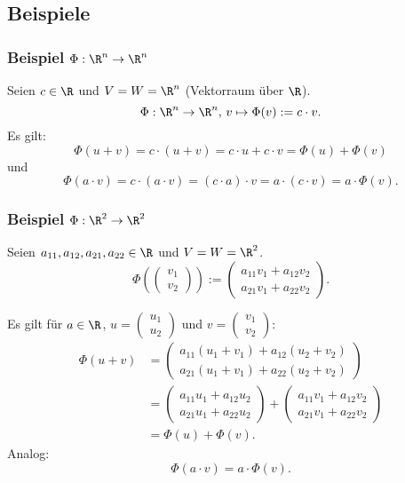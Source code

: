 \subsection{Beispiele}
%
\begin{frame}\frametitle{Beispiel $\Phi: \R^n\to \R^n$}


	Seien $c \in \R$ und $V=W=\R^n$ (Vektorraum über $\R$).
	$$
		\Phi: \R^n \to \R^n, \, v \mapsto \Phi(v) := c\cdot v.
	$$\pause
	Es gilt:
$$
		\Phi(u+v) 		= c\cdot(u+v) = c\cdot u + c\cdot v = \Phi(u) + \Phi(v)
$$\pause
und 
$$
		\Phi(a\cdot v)	= c\cdot (a\cdot v) = (c\cdot a)\cdot v = a\cdot (c\cdot v) = a\cdot \Phi(v).
$$
	
\end{frame}
%
%
\begin{frame}\frametitle{Beispiel $\Phi: \R^2\to \R^2$}

	Seien $a_{11}, a_{12}, a_{21}, a_{22} \in \R$ und $V=W=\R^2$.
	$$
		\Phi\left( 	
				\begin{pmatrix}
					v_1	\\
					v_2	
				\end{pmatrix}
			\right) 
		:=
		\begin{pmatrix}
			a_{11}v_1 + a_{12}v_2	\\
			a_{21}v_1 + a_{22}v_2	
		\end{pmatrix}.
	$$
	\pause
	\vspace{4mm}
	
	Es gilt für $a \in \R$,
	$
		u = 
		\begin{pmatrix}
			u_1	\\
			u_2	
		\end{pmatrix}
	$
	und
	$
		v = 
		\begin{pmatrix}
			v_1	\\
			v_2	
		\end{pmatrix}:
	$			\pause	
	\begin{align*}
		\Phi(u+v) 		
			&= 
			\begin{pmatrix}
				a_{11}(u_1+v_1) + a_{12}(u_2+v_2)	\\
				a_{21}(u_1+v_1) + a_{22}(u_2+v_2)		
			\end{pmatrix}	\\
			&=
			\begin{pmatrix}
				a_{11}u_1 + a_{12}u_2	\\
				a_{21}u_1 + a_{22}u_2		
			\end{pmatrix}
			+
			\begin{pmatrix}
				a_{11}v_1 + a_{12}v_2	\\
				a_{21}v_1 + a_{22}v_2		
			\end{pmatrix}	\\
			&=
			\Phi(u) + \Phi(v).	
	\end{align*}	\pause
	Analog:
	$$
		\Phi(a\cdot v) = a\cdot \Phi(v).
	$$	
	
\end{frame}
